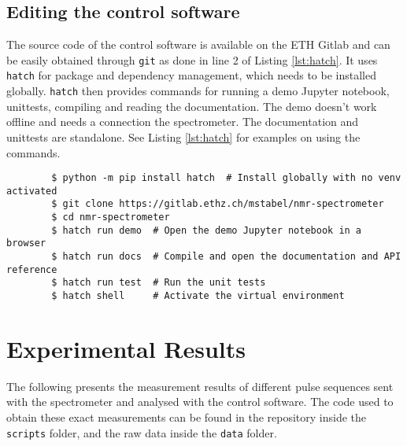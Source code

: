 \section{Editing the control software}
The source code of the control software is available on the ETH Gitlab and can be easily obtained through \lstinline{git} as done in line 2 of Listing \ref{lst:hatch}. It uses \lstinline{hatch} for package and dependency management, which needs to be installed globally. \lstinline{hatch} then provides commands for running a demo Jupyter notebook, unittests, compiling and reading the documentation. The demo doesn't work offline and needs a connection the spectrometer. The documentation and unittests are standalone. See Listing \ref{lst:hatch} for examples on using the commands.

\begin{listing}[h!bt]
    \begin{verbatim}
        $ python -m pip install hatch  # Install globally with no venv activated
        $ git clone https://gitlab.ethz.ch/mstabel/nmr-spectrometer
        $ cd nmr-spectrometer
        $ hatch run demo  # Open the demo Jupyter notebook in a browser
        $ hatch run docs  # Compile and open the documentation and API reference
        $ hatch run test  # Run the unit tests
        $ hatch shell     # Activate the virtual environment
    \end{verbatim}
    \caption{. The invoked commands can be found in the \lstinline{pyprojects.toml} file in the repository. Examples for using the library are available in the \lstinline{scripts} and \lstinline{docs} folders.}
    \label{lst:hatch}
\end{listing}

\chapter{Experimental Results}
The following presents the measurement results of different pulse sequences sent with the spectrometer and analysed with the control software. The code used to obtain these exact measurements can be found in the repository inside the \lstinline{scripts} folder, and the raw data inside the \lstinline{data} folder.

